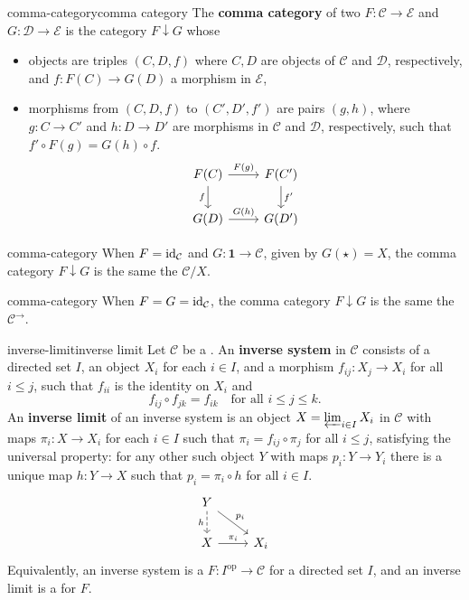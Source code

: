 \begin{topic}{comma-category}{comma category}
    The \textbf{comma category} of two  $F : \mathcal{C} \to \mathcal{E}$ and $G : \mathcal{D} \to \mathcal{E}$ is the category $F \downarrow G$ whose
    \begin{itemize}
        \item objects are triples $(C, D, f)$ where $C, D$ are objects of $\mathcal{C}$ and $\mathcal{D}$, respectively, and $f : F(C) \to G(D)$ a morphism in $\mathcal{E}$,
        \item morphisms from $(C, D, f)$ to $(C', D', f')$ are pairs $(g, h)$, where $g : C \to C'$ and $h : D \to D'$ are morphisms in $\mathcal{C}$ and $\mathcal{D}$, respectively, such that $f' \circ F(g) = G(h) \circ f$.
        \[ \begin{tikzcd}
            F(C) \arrow{r}{F(g)} \arrow[swap]{d}{f} & F(C') \arrow{d}{f'} \\ G(D) \arrow{r}{G(h)} & G(D')
        \end{tikzcd} \]
    \end{itemize}
\end{topic}

\begin{example}{comma-category}
    When $F = \text{id}_\mathcal{C}$ and $G : \textbf{1} \to \mathcal{C}$, given by $G(\star) = X$, the comma category $F \downarrow G$ is the same the  $\mathcal{C}/X$.
\end{example}

\begin{example}{comma-category}
    When $F = G = \text{id}_\mathcal{C}$, the comma category $F \downarrow G$ is the same the  $\mathcal{C}^\rightarrow$.
\end{example}

\begin{topic}{inverse-limit}{inverse limit}
    Let $\mathcal{C}$ be a . An \textbf{inverse system} in $\mathcal{C}$ consists of a directed set $I$, an object $X_i$ for each $i \in I$, and a morphism $f_{ij} : X_j \to X_i$ for all $i \le j$, such that $f_{ii}$ is the identity on $X_i$ and
    \[ f_{ij} \circ f_{jk} = f_{ik} \quad \text{for all } i \le j \le k . \]
    An \textbf{inverse limit} of an inverse system is an object $X = \varprojlim_{i \in I} X_i$ in $\mathcal{C}$ with maps $\pi_i : X \to X_i$ for each $i \in I$ such that $\pi_i = f_{ij} \circ \pi_j$ for all $i \le j$, satisfying the universal property: for any other such object $Y$ with maps $p_i : Y \to Y_i$ there is a unique map $h : Y \to X$ such that $p_i = \pi_i \circ h$ for all $i \in I$.
    \[ \begin{tikzcd} Y \arrow[dashed, swap]{d}{h} \arrow{dr}{p_i} & \\ X \arrow{r}{\pi_i} & X_i \end{tikzcd} \]
    Equivalently, an inverse system is a  $F : I^\text{op} \to \mathcal{C}$ for a directed set $I$, and an inverse limit is a  for $F$.
\end{topic}

